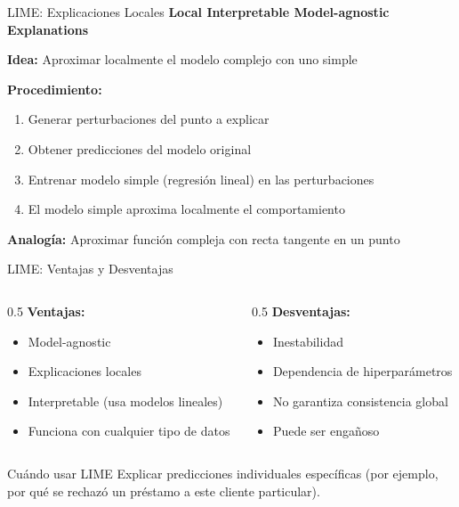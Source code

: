 \documentclass[aspectratio=169]{beamer}
\begin{document}
\begin{frame}{LIME: Explicaciones Locales}
\textbf{Local Interpretable Model-agnostic Explanations}

\vspace{0.3cm}

\textbf{Idea:} Aproximar localmente el modelo complejo con uno simple

\vspace{0.3cm}

\textbf{Procedimiento:}
\begin{enumerate}
\item Generar perturbaciones del punto a explicar
\item Obtener predicciones del modelo original
\item Entrenar modelo simple (regresión lineal) en las perturbaciones
\item El modelo simple aproxima localmente el comportamiento
\end{enumerate}

\vspace{0.3cm}

\textbf{Analogía:} Aproximar función compleja con recta tangente en un punto
\end{frame}

\begin{frame}{LIME: Ventajas y Desventajas}
\begin{columns}
\begin{column}{0.5\textwidth}
\textbf{Ventajas:}
\begin{itemize}
\item Model-agnostic
\item Explicaciones locales
\item Interpretable (usa modelos lineales)
\item Funciona con cualquier tipo de datos
\end{itemize}
\end{column}

\begin{column}{0.5\textwidth}
\textbf{Desventajas:}
\begin{itemize}
\item Inestabilidad
\item Dependencia de hiperparámetros
\item No garantiza consistencia global
\item Puede ser engañoso
\end{itemize}
\end{column}
\end{columns}

\vspace{0.4cm}

\begin{block}{Cuándo usar LIME}
Explicar predicciones individuales específicas (por ejemplo, por qué se rechazó un préstamo a este cliente particular).
\end{block}
\end{frame}
\end{document}
